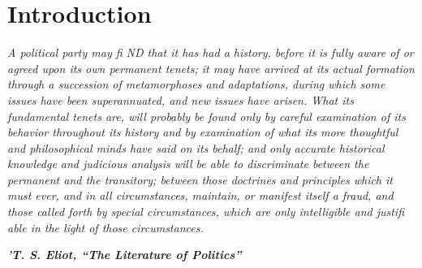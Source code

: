 {\chapter{Introduction} } {\label{Introduction} }{\par}{\textit{	A political party may ﬁ ND that it has had a history, before it is fully aware of or agreed upon its own permanent tenets; it may have arrived at its actual formation through a succession of metamorphoses and adaptations, during which some issues have been superannuated, and new issues have arisen. What its fundamental tenets are, will probably be found only by careful examination of its behavior throughout its history and by examination of what its more thoughtful and philosophical minds have said on its behalf; and only accurate historical knowledge and judicious analysis will be able to discriminate between the permanent and the transitory; between those doctrines and principles which it must ever, and in all circumstances, maintain, or manifest itself a fraud, and those called forth by special circumstances, which are only intelligible and justiﬁ able in the light of those circumstances.} } {\par}{\par} {\textbf{\textit{	’T. S. Eliot, “The Literature of Politics”} } } {\par} 

